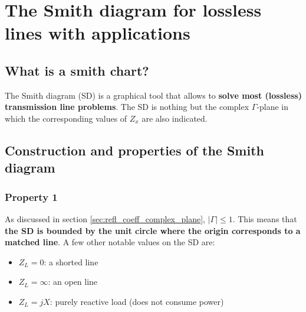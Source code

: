 \documentclass[../transmission.tex]{subfiles}
\begin{document}
	\section{The Smith diagram for lossless lines with applications}
		\subsection{What is a smith chart?}
			The Smith diagram (SD) is a graphical tool that allows to \textbf{solve most (lossless) transmission line problems}. The SD is nothing but the complex $\Gamma$-plane in which the corresponding values of $Z_x$ are also indicated. 
			
		\subsection{Construction and properties of the Smith diagram}
			\subsubsection{Property 1}
				As discussed in section \ref{sec:refl_coeff_complex_plane}, $|\Gamma|\leq1$. This means that \textbf{the SD is bounded by the unit circle where the origin corresponds to a matched line}. A few other notable values on the SD are:
				\begin{itemize}
					\item $Z_L=0$: a shorted line
					\item $Z_L=\infty$: an open line
					\item $Z_L=jX$: purely reactive load (does not consume power)
				\end{itemize}
\end{document}
